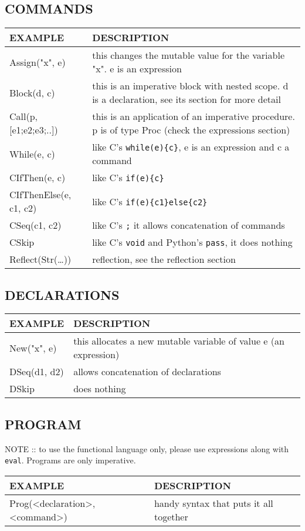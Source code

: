 \documentclass[11pt]{article}
\begin{document}
\subsection{COMMANDS}
\label{sec:org71dfa91}
\begin{center}
\begin{tabularx}{\textwidth}{lX}
EXAMPLE & DESCRIPTION\\
\hline
Assign("x", e) & this changes the mutable value for the variable "x". e is an expression\\
Block(d, c) & this is an imperative block with nested scope. d is a declaration, see its section for more detail\\
Call(p, [e1;e2;e3;..]) & this is an application of an imperative procedure. p is of type Proc (check the expressions section)\\
While(e, c) & like C's \texttt{while(e)\{c\}}, e is an expression and c a command\\
CIfThen(e, c) & like C's \texttt{if(e)\{c\}}\\
CIfThenElse(e, c1, c2) & like C's \texttt{if(e)\{c1\}else\{c2\}}\\
CSeq(c1, c2) & like C's \texttt{;} it allows concatenation of commands\\
CSkip & like C's \texttt{void} and Python's \texttt{pass}, it does nothing\\
Reflect(Str(\ldots{})) & reflection, see the reflection section\\
\end{tabularx}
\end{center}
\subsection{DECLARATIONS}
\label{sec:orge6c00da}
\begin{center}
\begin{tabularx}{\textwidth}{lX}
EXAMPLE & DESCRIPTION\\
\hline
New("x", e) & this allocates a new mutable variable of value e (an expression)\\
DSeq(d1, d2) & allows concatenation of declarations\\
DSkip & does nothing\\
\end{tabularx}
\end{center}
\subsection{PROGRAM}
\label{sec:orgb88bd40}
NOTE :: to use the functional language only, please use expressions along with \texttt{eval}. Programs are only imperative.
\begin{center}
\begin{tabularx}{\textwidth}{ll}
EXAMPLE & DESCRIPTION\\
\hline
Prog(<declaration>, <command>) & handy syntax that puts it all together\\
\end{tabularx}
\end{center}
\end{document}
